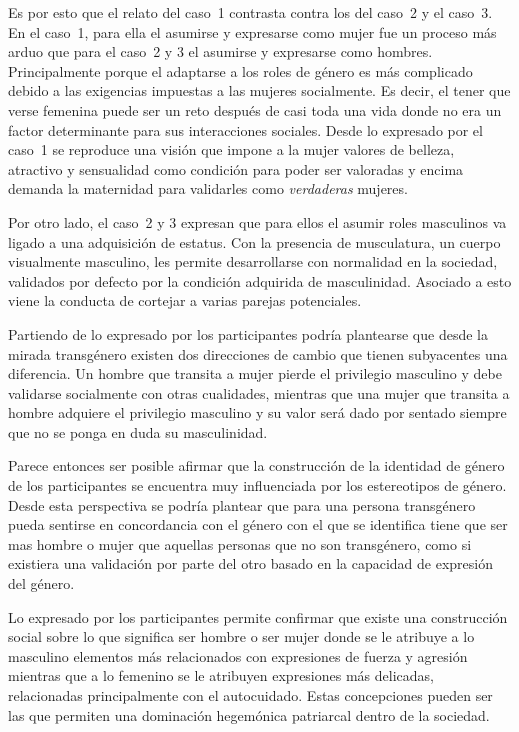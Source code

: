 Es por esto que el relato del caso~1 contrasta contra los del caso~2 y el
caso~3. En el caso~1, para ella el asumirse y expresarse como mujer fue un
proceso más arduo que para el caso~2 y 3 el asumirse y expresarse como hombres.
Principalmente porque el adaptarse a los roles de género es más complicado
debido a las exigencias impuestas a las mujeres socialmente. Es decir, el tener
que verse femenina puede ser un reto después de casi toda una vida donde no era
un factor determinante para sus interacciones sociales. Desde lo expresado por
el caso~1 se reproduce una visión que impone a la mujer valores de belleza,
atractivo y sensualidad como condición para poder ser valoradas y encima demanda
la maternidad para validarles como \emph{verdaderas} mujeres.

Por otro lado, el caso~2 y 3 expresan que para ellos el asumir roles masculinos
va ligado a una adquisición de estatus. Con la presencia de musculatura, un
cuerpo visualmente masculino, les permite desarrollarse con normalidad en la
sociedad, validados por defecto por la condición adquirida de masculinidad.
Asociado a esto viene la conducta de cortejar a varias parejas
potenciales.

Partiendo de lo expresado por los participantes podría plantearse que desde la
mirada transgénero existen dos direcciones de cambio que tienen subyacentes una
diferencia. Un hombre que transita a mujer pierde el privilegio masculino y debe
validarse socialmente con otras cualidades, mientras que una mujer que transita
a hombre adquiere el privilegio masculino y su valor será dado por sentado
siempre que no se ponga en duda su masculinidad.

Parece entonces ser posible afirmar que la construcción de la identidad de
género de los participantes se encuentra muy influenciada por los estereotipos
de género. Desde esta perspectiva se podría plantear que para una persona
transgénero pueda sentirse en concordancia con el género con el que se
identifica tiene que ser mas hombre o mujer que aquellas personas que no son
transgénero, como si existiera una validación por parte del otro basado en la
capacidad de expresión del género.

Lo expresado por los participantes permite confirmar que existe una construcción
social sobre lo que significa ser hombre o ser mujer donde se le atribuye a lo
masculino elementos más relacionados con expresiones de fuerza y agresión
mientras que a lo femenino se le atribuyen expresiones más delicadas,
relacionadas principalmente con el autocuidado. Estas concepciones pueden ser
las que permiten una dominación hegemónica patriarcal dentro de la sociedad.

